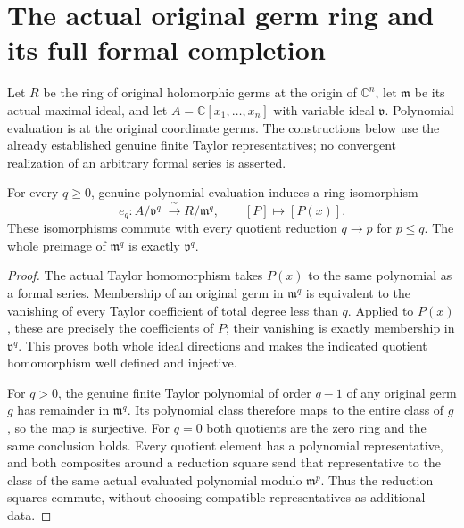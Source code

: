 \section{The actual original germ ring and its full formal completion}

Let $R$ be the ring of original holomorphic germs at the origin of
$\mathbb C^n$, let $\mathfrak m$ be its actual maximal ideal, and let
$A=\mathbb C[x_1,\ldots,x_n]$ with variable ideal $\mathfrak v$.
Polynomial evaluation is at the original coordinate germs. The constructions
below use the already established genuine finite Taylor representatives;
no convergent realization of an arbitrary formal series is asserted.

\begin{theorem}
\label{hir:actual-original-polynomial-jet-ring-equivalences}
\leanok
For every $q\geq0$, genuine polynomial evaluation induces a ring
isomorphism
\[
 e_q:A/\mathfrak v^q\;\xrightarrow{\;\sim\;}R/\mathfrak m^q,
 \qquad [P]\longmapsto[P(x)].
\]
These isomorphisms commute with every quotient reduction $q\to p$ for
$p\leq q$. The whole preimage of $\mathfrak m^q$ is exactly
$\mathfrak v^q$.
\end{theorem}
\begin{proof}
The actual Taylor homomorphism takes $P(x)$ to the same polynomial as a
formal series. Membership of an original germ in $\mathfrak m^q$ is
equivalent to the vanishing of every Taylor coefficient of total degree
less than $q$. Applied to $P(x)$, these are precisely the coefficients of
$P$; their vanishing is exactly membership in $\mathfrak v^q$. This proves
both whole ideal directions and makes the indicated quotient homomorphism
well defined and injective.

For $q>0$, the genuine finite Taylor polynomial of order $q-1$ of any
original germ $g$ has remainder in $\mathfrak m^q$. Its polynomial class
therefore maps to the entire class of $g$, so the map is surjective.
For $q=0$ both quotients are the zero ring and the same conclusion holds.
Every quotient element has a polynomial representative, and both
composites around a reduction square send that representative to the
class of the same actual evaluated polynomial modulo $\mathfrak m^p$.
Thus the reduction squares commute, without choosing compatible
representatives as additional data.
\end{proof}


